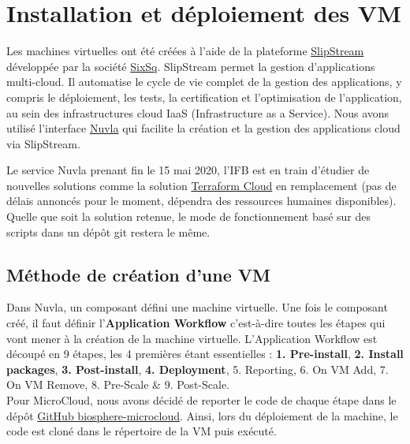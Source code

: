 \section {Installation et déploiement des VM}
Les machines virtuelles ont été créées à l'aide de la plateforme \href{https://github.com/slipstream/SlipStream}{SlipStream} développée par la société \href {https://sixsq.com/}{SixSq}. SlipStream permet la gestion d'applications multi-cloud. Il automatise le cycle de vie complet de la gestion des applications, y compris le déploiement, les tests, la certification et l'optimisation de l'application, au sein des infrastructures cloud IaaS (Infrastructure as a Service). Nous avons utilisé l'interface \href {https://docs.nuvla.io/nuvla}{Nuvla} qui facilite la création et la gestion des applications cloud via SlipStream.
\newline

Le service Nuvla prenant fin le 15 mai 2020, l'IFB est en train d'étudier de nouvelles solutions comme la solution \href {https://www.hashicorp.com/blog/announcing-terraform-cloud/}{Terraform Cloud} en remplacement (pas de délais annoncés pour le moment, dépendra des ressources humaines disponibles). Quelle que soit la solution retenue, le mode de fonctionnement basé sur des scripts dans un dépôt git restera le même.

\subsection{Méthode de création d'une VM}

Dans Nuvla, un composant défini une machine virtuelle. Une fois le composant créé, il faut définir l'\textbf{Application Workflow} c'est-à-dire toutes les étapes qui vont mener à la création de la machine virtuelle.
L'Application Workflow est découpé en 9 étapes, les 4 premières étant essentielles : \textbf{1. Pre-install}, \textbf{2. Install packages}, \textbf{3. Post-install}, \textbf{4. Deployment}, 5. Reporting, 6. On VM Add, 7. On VM Remove, 8. Pre-Scale \& 9. Post-Scale.\\

Pour MicroCloud, nous avons décidé de reporter le code de chaque étape dans le dépôt \href{https://github.com/IFB-ElixirFr/biosphere-microcloud}{GitHub biosphere-microcloud}. Ainsi, lors du déploiement de la machine, le code est cloné dans le répertoire  de la VM puis exécuté.
\newline

